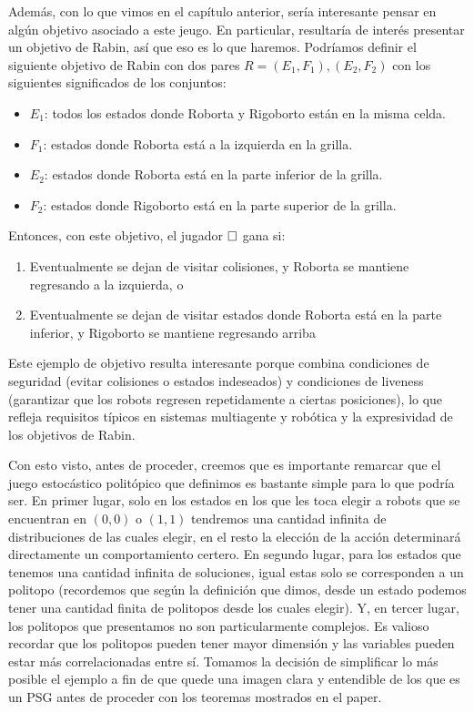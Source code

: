 Además, con lo que vimos en el capítulo anterior, sería interesante pensar en
algún objetivo asociado a este jeugo. En particular, resultaría de interés
presentar un objetivo de Rabin, así que eso es lo que haremos. Podríamos
definir el siguiente objetivo de Rabin con dos pares $R={(E_1,F_1),(E_2,F_2)}$
con los siguientes significados de los conjuntos:

\begin{itemize}
	\item $E_1$: todos los estados donde Roborta y Rigoborto están en la misma celda.
	\item $F_1$: estados donde Roborta está a la izquierda en la grilla.
	\item $E_2$: estados donde Roborta está en la parte inferior de la grilla.
	\item $F_2$: estados donde Rigoborto está en la parte superior de la grilla.
\end{itemize}

Entonces, con este objetivo, el jugador $\square$ gana si:
\begin{enumerate}
	\item Eventualmente se dejan de visitar colisiones, y Roborta se mantiene regresando
	      a la izquierda, o
	\item Eventualmente se dejan de visitar estados donde Roborta está en la parte
	      inferior, y Rigoborto se mantiene regresando arriba
\end{enumerate}

Este ejemplo de objetivo resulta interesante porque combina condiciones de
seguridad (evitar colisiones o estados indeseados) y condiciones de liveness
(garantizar que los robots regresen repetidamente a ciertas posiciones), lo que
refleja requisitos típicos en sistemas multiagente y robótica y la expresividad
de los objetivos de Rabin.

Con esto visto, antes de proceder, creemos que es importante remarcar que el
juego estocástico politópico que definimos es bastante simple para lo que
podría ser. En primer lugar, solo en los estados en los que les toca elegir a
robots que se encuentran en $(0,0)$ o $(1,1)$ tendremos una cantidad infinita
de distribuciones de las cuales elegir, en el resto la elección de la acción
determinará directamente un comportamiento certero. En segundo lugar, para los
estados que tenemos una cantidad infinita de soluciones, igual estas solo se
corresponden a un politopo (recordemos que según la definición que dimos, desde
un estado podemos tener una cantidad finita de politopos desde los cuales
elegir). Y, en tercer lugar, los politopos que presentamos no son
particularmente complejos. Es valioso recordar que los politopos pueden tener
mayor dimensión y las variables pueden estar más correlacionadas entre sí.
Tomamos la decisión de simplificar lo más posible el ejemplo a fin de que quede
una imagen clara y entendible de los que es un PSG antes de proceder con los
teoremas mostrados en el paper.

